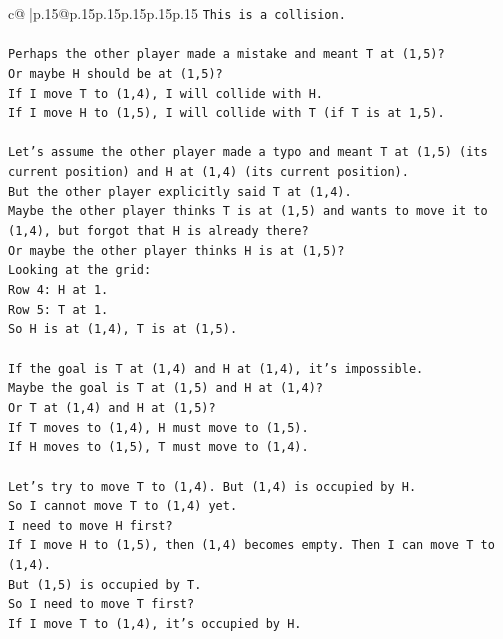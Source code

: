 \documentclass{article}
\begin{document}
{\begin{supertabular}{c@{$\;$}|p{.15\linewidth}@{}p{.15\linewidth}p{.15\linewidth}p{.15\linewidth}p{.15\linewidth}p{.15\linewidth}}
{{{\texttt{This is a collision.} \\
\\ 
\texttt{Perhaps the other player made a mistake and meant T at (1,5)?} \\
\texttt{Or maybe H should be at (1,5)?} \\
\texttt{If I move T to (1,4), I will collide with H.} \\
\texttt{If I move H to (1,5), I will collide with T (if T is at 1,5).} \\
\\ 
\texttt{Let's assume the other player made a typo and meant T at (1,5) (its current position) and H at (1,4) (its current position).} \\
\texttt{But the other player explicitly said T at (1,4).} \\
\texttt{Maybe the other player thinks T is at (1,5) and wants to move it to (1,4), but forgot that H is already there?} \\
\texttt{Or maybe the other player thinks H is at (1,5)?} \\
\texttt{Looking at the grid:} \\
\texttt{Row 4: H at 1.} \\
\texttt{Row 5: T at 1.} \\
\texttt{So H is at (1,4), T is at (1,5).} \\
\\ 
\texttt{If the goal is T at (1,4) and H at (1,4), it's impossible.} \\
\texttt{Maybe the goal is T at (1,5) and H at (1,4)?} \\
\texttt{Or T at (1,4) and H at (1,5)?} \\
\texttt{If T moves to (1,4), H must move to (1,5).} \\
\texttt{If H moves to (1,5), T must move to (1,4).} \\
\\ 
\texttt{Let's try to move T to (1,4). But (1,4) is occupied by H.} \\
\texttt{So I cannot move T to (1,4) yet.} \\
\texttt{I need to move H first?} \\
\texttt{If I move H to (1,5), then (1,4) becomes empty. Then I can move T to (1,4).} \\
\texttt{But (1,5) is occupied by T.} \\
\texttt{So I need to move T first?} \\
\texttt{If I move T to (1,4), it's occupied by H.} \\
}}}
\end{supertabular}}
\end{document}
